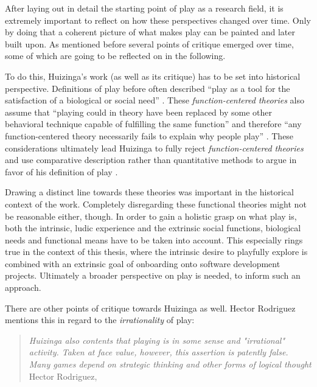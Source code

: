 After laying out in detail the starting point of play as a research field, it is extremely important to reflect on how these perspectives changed over time. Only by doing that a coherent picture of what makes play can be painted and later built upon. As mentioned before several points of critique emerged over time, some of which are going to be reflected on in the following.

To do this, Huizinga's work (as well as its critique) has to be set into historical perspective. Definitions of play before often described \enquote{play as a tool for the satisfaction of a biological or social need} \cite{rodriguez2006playful}. These \textit{function-centered theories} also assume that \enquote{playing could in theory have been replaced by some other behavioral technique capable of fulfilling the same function} \cite{rodriguez2006playful} and therefore \enquote{any function-centered theory necessarily fails to explain why people play} \cite{rodriguez2006playful}. These considerations ultimately lead Huizinga to fully reject \textit{function-centered theories} and use comparative description rather than quantitative methods to argue in favor of his definition of play \cite{rodriguez2006playful}.

Drawing a distinct line towards these theories was important in the historical context of the work. Completely disregarding these functional theories might not be reasonable either, though. In order to gain a holistic grasp on what play is, both the intrinsic, ludic experience and the extrinsic social functions, biological needs and functional means have to be taken into account. This especially rings true in the context of this thesis, where the intrinsic desire to playfully explore is combined with an extrinsic goal of onboarding onto software development projects. Ultimately a broader perspective on play is needed, to inform such an approach.

There are other points of critique towards Huizinga as well. Hector Rodriguez mentions this in regard to the \textit{irrationality} of play:

\begin{quote}
  \textit{Huizinga also contents that playing is in some sense and "irrational" activity. Taken at face value, however, this assertion is patently false. Many games depend on strategic thinking and other forms of logical thought}
  \footnotesize{Hector Rodriguez, \cite{rodriguez2006playful}}
\end{quote}

